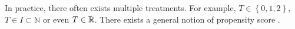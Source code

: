 In practice, there often exists multiple treatments.
For example, $T\in \left\{
  0,1,2
\right\}$, $T\in I\subset \mathbb{N}$ or even $T\in\mathbb{R}$. 
There exists a general notion of propensity score \cite{Hirano2005}.
